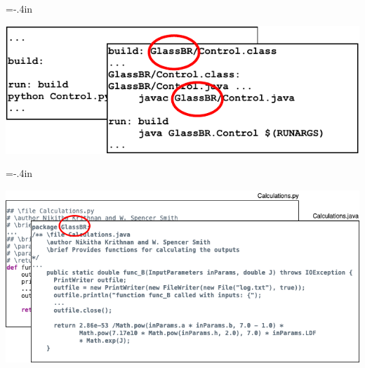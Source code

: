 \documentclass[usenames]{beamer}
\begin{document}
\hoffset=0in
\hoffset=-.4in
\begin{frame}


\includegraphics[width=1.05\textwidth]{../figures/MakefileCircleGlassBR.pdf}

\end{frame}
\hoffset=0in
\hoffset=-.4in
\begin{frame}


\includegraphics[width=1.05\textwidth]{../figures/CodeCircleGlassBR.png}

\end{frame}
\hoffset=0in
\end{document}
